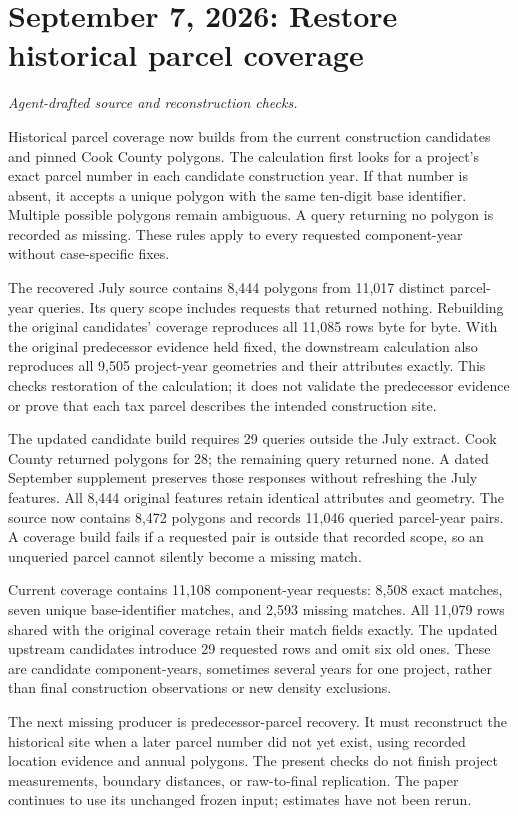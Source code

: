 \section*{September 7, 2026: Restore historical parcel coverage}
\textit{Agent-drafted source and reconstruction checks.}

Historical parcel coverage now builds from the current construction candidates
and pinned Cook County polygons. The calculation first looks for a project's
exact parcel number in each candidate construction year. If that number is absent,
it accepts a unique polygon with the same ten-digit base identifier. Multiple
possible polygons remain ambiguous. A query returning no polygon is recorded as missing.
These rules apply to every requested component-year without case-specific fixes.

The recovered July source contains 8,444 polygons from 11,017 distinct parcel-year
queries. Its query scope includes requests that returned nothing. Rebuilding the
original candidates' coverage reproduces all 11,085 rows byte for byte. With the
original predecessor evidence held fixed, the downstream calculation also
reproduces all 9,505 project-year geometries and their attributes exactly.
This checks restoration of the calculation; it does not validate the predecessor
evidence or prove that each tax parcel describes the intended construction site.

The updated candidate build requires 29 queries outside the July extract. Cook
County returned polygons for 28; the remaining query returned none. A dated
September supplement preserves those responses without refreshing the July
features. All 8,444 original features retain identical attributes and geometry.
The source now contains 8,472 polygons and records 11,046 queried parcel-year pairs.
A coverage build fails if a requested pair is outside that recorded scope, so an
unqueried parcel cannot silently become a missing match.

Current coverage contains 11,108 component-year requests: 8,508 exact matches,
seven unique base-identifier matches, and 2,593 missing matches. All 11,079 rows
shared with the original coverage retain their match fields exactly. The updated
upstream candidates introduce 29 requested rows and omit six old ones. These are
candidate component-years, sometimes several years for one project, rather than
final construction observations or new density exclusions.

The next missing producer is predecessor-parcel recovery. It must reconstruct
the historical site when a later parcel number did not yet exist, using recorded
location evidence and annual polygons. The present checks do not finish project
measurements, boundary distances, or raw-to-final replication. The paper continues
to use its unchanged frozen input; estimates have not been rerun.

